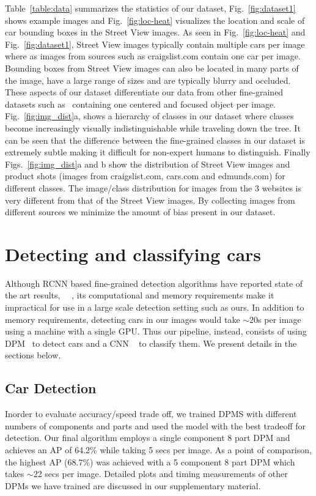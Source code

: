 \documentclass[10pt,twocolumn,letterpaper]{article}
\begin{document}
Table~\ref{table:data} summarizes the statistics of our dataset, Fig.~\ref{fig:dataset1} shows example images and Fig.~\ref{fig:loc-heat} visualizes the location and scale of car bounding boxes in the Street View images. As seen in Fig.~\ref{fig:loc-heat} and Fig.~\ref{fig:dataset1}, Street View images typically contain multiple cars per image where as images from sources such as craigslist.com contain one car per image. Bounding boxes from Street View images can also be located in many parts of the image, have a large range of sizes and are typically blurry and occluded. These  aspects of our dataset differentiate our data from other fine-grained datasets such as~\cite{birds} containing one centered and focused object per image. Fig.~\ref{fig:img_dist}a, shows a hierarchy of classes in our dataset where classes become increasingly visually indistinguishable while traveling down the tree. It can be seen that the difference between the fine-grained classes in our dataset is extremely subtle making it difficult for non-expert humans to distinguish. Finally Figs.~\ref{fig:img_dist}a and b show the distribution of Street View images and product shots (images from craigslist.com, cars.com and edmunds.com) for different classes. The image/class distribution for images from the 3 websites is very different from that of the Street View images. By collecting images from different sources we minimize the amount of bias present in our dataset.

\section{Detecting and classifying cars}
\label{sec:detection}
Although RCNN based fine-grained detection algorithms have reported state of the art results, ~\cite{rcnn}~\cite{ning}, its computational and memory requirements make it impractical for use in a large scale detection setting such as ours. In addition to memory requirements, detecting cars in our images would take \(\sim\)20s per image using a machine with a single GPU. Thus our pipeline, instead, consists of using DPM~\cite{dpm} to detect cars and a CNN ~\cite{alexnet} to classify them. We present details in the sections below.

\subsection{Car Detection}
Inorder to evaluate accuracy/speed trade off, we trained DPMS with different numbers of components and parts and used the model with the best tradeoff for detection. Our final algorithm employs a single component 8 part DPM and achieves an AP of 64.2\% while taking 5 secs per image. As a point of comparison, the highest AP (68.7\%) was achieved with a 5 component 8 part DPM which takes \(\sim\)22 secs per image. Detailed plots and timing measurements of other DPMs we have trained are discussed in our supplementary material.
\end{document}
